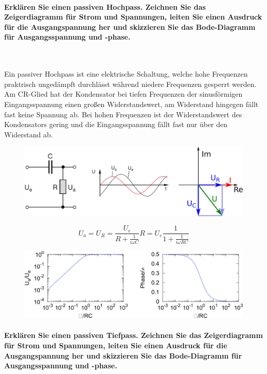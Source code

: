 \documentclass[a4paper, 11pt, parskip=half]{scrartcl}
\begin{document}
\paragraph{Erklären Sie einen passiven Hochpass. Zeichnen Sie das Zeigerdiagramm für Strom und
Spannungen, leiten Sie einen Ausdruck für die Ausgangspannung her und skizzieren Sie das
Bode-Diagramm für Ausgangsspannung und -phase.} ~

Ein passiver Hochpass ist eine elektrische Schaltung, welche hohe Frequenzen praktrisch ungedämpft
durchlässt während niedere Frequenzen gesperrt werden. Am CR-Glied hat der Kondensator bei tiefen
Frequenzen der sinusförmigen Eingangsspannung einen großen Widerstandswert, am Widerstand hingegen
fällt fast keine Spannung ab. Bei hohen Frequenzen ist der Widerstandswert des Kondensators gering
und die Eingangsspannung fällt fast nur über den Widerstand ab.

\begin{figure}[H]
    \centering
    \includegraphics[width=12cm]{image/10/3.1}
\end{figure}
\begin{equation}
    U_a
    = U_R
    = \frac{U_e}{R + \frac{1}{i \omega C}} R
    = U_e \frac{1}{1 + \frac{1}{i \omega R C}}
\end{equation}
\begin{figure}[H]
    \centering
    \includegraphics[width=12cm]{image/10/3.2}
\end{figure}

\paragraph{Erklären Sie einen passiven Tiefpass. Zeichnen Sie das Zeigerdiagramm für Strom und
Spannungen, leiten Sie einen Ausdruck für die Ausgangspannung her und skizzieren Sie das
Bode-Diagramm für Ausgangsspannung und -phase.} ~
\end{document}
